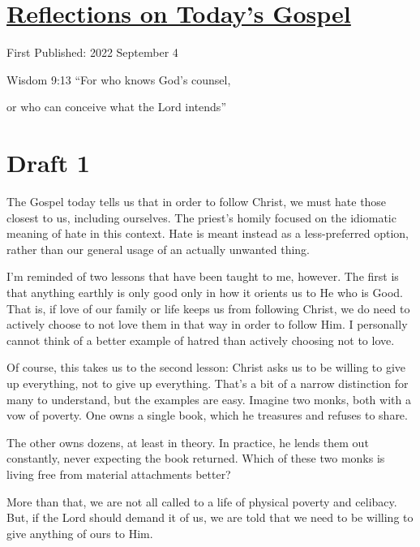 \documentclass[12pt]{article}[titlepage]
\newcommand{\say}[1]{``#1''}
\newcommand{\1}{\={a}}
\newcommand{\2}{\={e}}
\newcommand{\3}{\={\i}}
\newcommand{\4}{\=o}
\newcommand{\5}{\=u}
\newcommand{\6}{\={A}}
\renewcommand{\,}{\textsuperscript{,}}
\begin{document}
\doublespacing
\section{\href{reflections-on-readings-23-ordinary-c-22.html}{Reflections on Today's Gospel}}
First Published: 2022 September 4

Wisdom 9:13 \say{For who knows God's counsel,

or who can conceive what the Lord intends}

\section{Draft 1}
The Gospel today tells us that in order to follow Christ, we must hate those closest to us, including ourselves.
The priest's homily focused on the idiomatic meaning of hate in this context.
Hate is meant instead as a less-preferred option, rather than our general usage of an actually unwanted thing.

I'm reminded of two lessons that have been taught to me, however.
The first is that anything earthly is only good only in how it orients us to He who is Good.
That is, if love of our family or life keeps us from following Christ, we do need to actively choose to not love them in that way in order to follow Him.
I personally cannot think of a better example of hatred than actively choosing not to love.

Of course, this takes us to the second lesson: Christ asks us to be willing to give up everything, not to give up everything.
That's a bit of a narrow distinction for many to understand, but the examples are easy.
Imagine two monks, both with a vow of poverty.
One owns a single book, which he treasures and refuses to share.

The other owns dozens, at least in theory.
In practice, he lends them out constantly, never expecting the book returned.
Which of these two monks is living free from material attachments better?

More than that, we are not all called to a life of physical poverty and celibacy.
But, if the Lord should demand it of us, we are told that we need to be willing to give anything of ours to Him.
\end{document}
